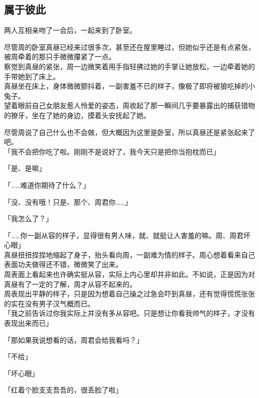 \subsection{属于彼此}

两人互相亲吻了一会后，一起来到了卧室。

尽管周的卧室真昼已经来过很多次，甚至还在屋里睡过，但她似乎还是有点紧张，被周牵着的那只手微微攥紧了一点。\\

察觉到真昼的紧张，周一边微笑着用手指轻拂过她的手掌让她放松，一边牵着她的手带她到了床上。\\

真昼坐在床上，身体微微颤抖着，一副害羞不已的样子，像极了即将被狼吃掉的小兔子。\\

望着眼前自己女朋友惹人怜爱的姿态，周收起了那一瞬间几乎要暴露出的捕获猎物的獠牙，坐在了她的身边，摸着头安抚起了她。

尽管周说了自己什么也不会做，但大概因为这里是卧室，所以真昼还是紧张起来了吧。\\

「我不会把你吃了啦。刚刚不是说好了，我今天只是把你当抱枕而已」

「是、是嘛」

「……难道你期待了什么？」

「没、没有哦！只是、那个、周君你……」

「我怎么了？」

「……你一副从容的样子，显得很有男人味，就、就挺让人害羞的嘛。周、周君坏心眼」\\

真昼扭扭捏捏地缩起了身子，抬头看向周，一副难为情的样子。周心想着看来自己表面功夫做得还不错，微微笑了出来。\\

周表面上看起来也许确实挺从容，实际上内心里却并非如此。不如说，正是因为对真昼有了一定的了解，周才从容不起来的。\\

周表现出平静的样子，只是因为想着自己操之过急会吓到真昼，还有觉得慌慌张张的实在没有男子汉气概而已。\\

「我之前告诉过你我实际上并没有多从容吧。只是想让你看我帅气的样子，才没有表现出来而已」

「那如果我说想看的话，周君会给我看吗？」

「不给」

「坏心眼」

「红着个脸支支吾吾的，很丢脸了啦」\\

